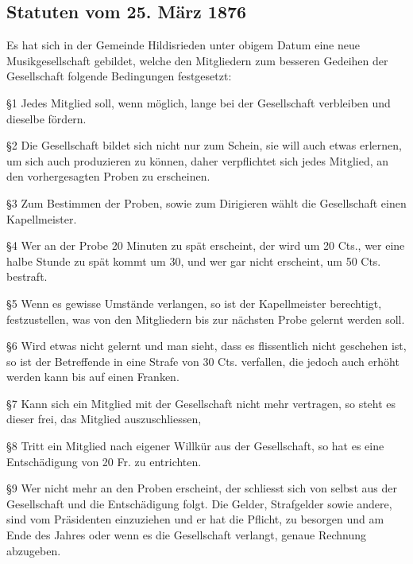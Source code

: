 \begin{multicols}{2}

    \subsection{Statuten vom 25. März 1876}

    Es hat sich in der Gemeinde Hildisrieden unter obigem
    Datum eine neue Musikgesellschaft gebildet, welche
    den Mitgliedern zum besseren Gedeihen der Gesellschaft
    folgende Bedingungen festgesetzt:

    \S1
    Jedes Mitglied soll, wenn möglich, lange bei der Gesellschaft
    verbleiben und dieselbe fördern.

    \S2
    Die Gesellschaft bildet sich nicht nur zum Schein, sie
    will auch etwas erlernen, um sich auch produzieren zu
    können, daher verpflichtet sich jedes Mitglied, an den
    vorhergesagten Proben zu erscheinen.

    \S3
    Zum Bestimmen der Proben, sowie zum Dirigieren
    wählt die Gesellschaft einen Kapellmeister.

    \S4
    Wer an der Probe 20 Minuten zu spät erscheint, der
    wird um 20 Cts., wer eine halbe Stunde zu spät kommt
    um 30, und wer gar nicht erscheint, um 50 Cts. bestraft.

    \S5
    Wenn es gewisse Umstände verlangen, so ist der Kapellmeister
    berechtigt, festzustellen, was von den Mitgliedern bis zur
    nächsten Probe gelernt werden soll.

    \S6
    Wird etwas nicht gelernt und man sieht, dass es flissentlich
    nicht geschehen ist, so ist der Betreffende in
    eine Strafe von 30 Cts. verfallen, die jedoch auch erhöht werden
    kann bis auf einen Franken.

    \S7
    Kann sich ein Mitglied mit der Gesellschaft nicht mehr
    vertragen, so steht es dieser frei, das Mitglied auszuschliessen,

    \S8
    Tritt ein Mitglied nach eigener Willkür aus der Gesellschaft,
    so hat es eine Entschädigung von 20 Fr. zu entrichten.

    \S9
    Wer nicht mehr an den Proben erscheint, der schliesst
    sich von selbst aus der Gesellschaft und die Entschädigung folgt.
    Die Gelder, Strafgelder sowie andere, sind vom Präsidenten einzuziehen
    und er hat die Pflicht, zu besorgen und am Ende des Jahres oder wenn
    es die Gesellschaft verlangt, genaue Rechnung abzugeben.


\end{multicols}

